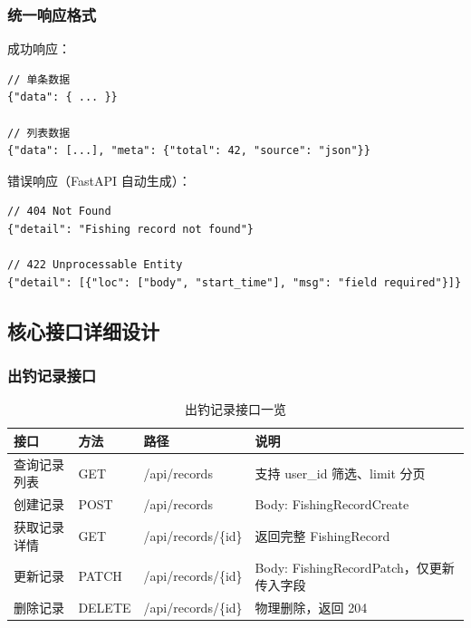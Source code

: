 \documentclass[12pt,a4paper]{ctexart}
\begin{document}
\subsubsection{统一响应格式}

成功响应：

\begin{lstlisting}[caption={成功响应格式},label={lst:response-ok}]
// 单条数据
{"data": { ... }}

// 列表数据
{"data": [...], "meta": {"total": 42, "source": "json"}}
\end{lstlisting}

错误响应（FastAPI 自动生成）：

\begin{lstlisting}[caption={错误响应格式},label={lst:response-error}]
// 404 Not Found
{"detail": "Fishing record not found"}

// 422 Unprocessable Entity
{"detail": [{"loc": ["body", "start_time"], "msg": "field required"}]}
\end{lstlisting}

\subsection{核心接口详细设计}

\subsubsection{出钓记录接口}

\begin{table}[H]
  \centering
  \caption{出钓记录接口一览}
  \label{tab:api-records}
  \begin{tabular}{p{2.5cm}p{2cm}p{3cm}p{4.5cm}}
    \toprule
    \textbf{接口} & \textbf{方法} & \textbf{路径} & \textbf{说明} \\
    \midrule
    查询记录列表 & GET & /api/records & 支持 user\_id 筛选、limit 分页 \\
    创建记录 & POST & /api/records & Body: FishingRecordCreate \\
    获取记录详情 & GET & /api/records/\{id\} & 返回完整 FishingRecord \\
    更新记录 & PATCH & /api/records/\{id\} & Body: FishingRecordPatch，仅更新传入字段 \\
    删除记录 & DELETE & /api/records/\{id\} & 物理删除，返回 204 \\
    \bottomrule
  \end{tabular}
\end{table}
\end{document}
